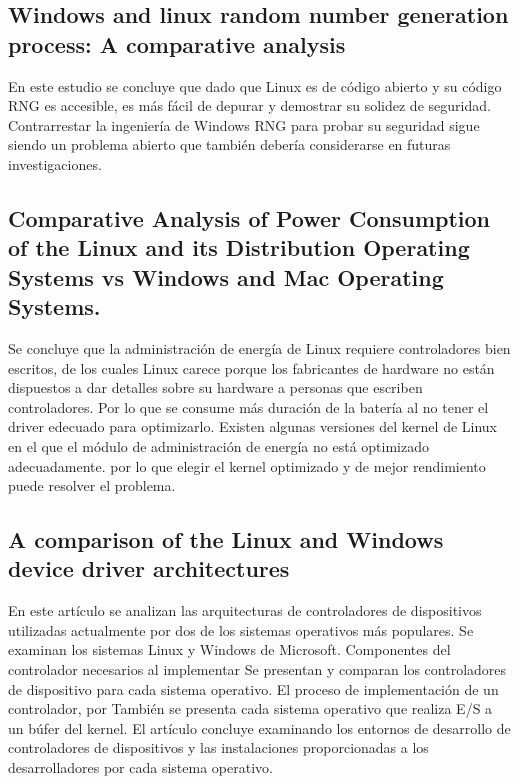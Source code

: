 \documentclass[conference]{IEEEtran}
\begin{document}
\subsection{Windows and linux random number generation process: A comparative analysis}
\cite{alzhrani2015windows} En este estudio se concluye que dado que Linux es de código abierto y su código RNG es accesible, es más fácil de depurar y demostrar su solidez de seguridad. Contrarrestar la ingeniería de Windows RNG para probar su seguridad sigue siendo un problema abierto que también debería considerarse en futuras investigaciones.

\subsection{Comparative Analysis of Power Consumption of the Linux and its Distribution Operating Systems vs Windows and Mac Operating Systems. }
\cite{najmuddin2021comparative} Se concluye que la administración de energía de Linux requiere controladores bien escritos, de los cuales Linux carece porque los fabricantes de hardware no están dispuestos a dar detalles sobre su hardware a personas que escriben controladores. Por lo que se consume más duración de la batería al no tener el driver edecuado para optimizarlo. Existen algunas versiones del kernel de Linux en el que el módulo de administración de energía no está optimizado adecuadamente. por lo que elegir el kernel optimizado y de mejor rendimiento puede resolver el problema.

\subsection{A comparison of the Linux and Windows device driver architectures}
\cite{tsegaye2004comparison} En este artículo se analizan las arquitecturas de controladores de dispositivos utilizadas actualmente por dos de los sistemas operativos más populares.
Se examinan los sistemas Linux y Windows de Microsoft. Componentes del controlador necesarios al implementar
Se presentan y comparan los controladores de dispositivo para cada sistema operativo. El proceso de implementación de un controlador, por
También se presenta cada sistema operativo que realiza E/S a un búfer del kernel. El artículo concluye examinando
los entornos de desarrollo de controladores de dispositivos y las instalaciones proporcionadas a los desarrolladores por cada sistema operativo.
\printbibliography


\end{document}
